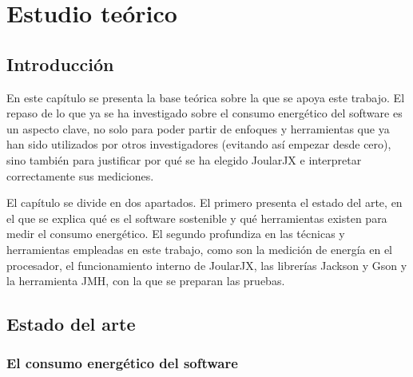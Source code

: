 \chapter{Estudio teórico}
\label{cha:estudio-teorico}



\section{Introducción}
\label{sec:introduccion-teoria}


En este capítulo se presenta la base teórica sobre la que se apoya este
trabajo. El repaso de lo que ya se ha investigado sobre el consumo energético
del software es un aspecto clave, no solo para poder partir de enfoques y
herramientas que ya han sido utilizados por otros investigadores (evitando así
empezar desde cero), sino también para justificar por qué se ha elegido
JoularJX e interpretar correctamente sus mediciones.

El capítulo se divide en dos apartados. El primero presenta el estado del
arte, en el que se explica qué es el software sostenible y qué herramientas
existen para medir el consumo energético. El segundo
profundiza en las técnicas y herramientas empleadas en este trabajo, como son
la medición de energía en el procesador, el funcionamiento interno de
JoularJX, las librerías Jackson y Gson y la herramienta JMH, con la que se
preparan las pruebas.


\section{Estado del arte}
\label{sec:estado-arte}

\subsection{El consumo energético del software}
\label{subsec:consumo-software}

